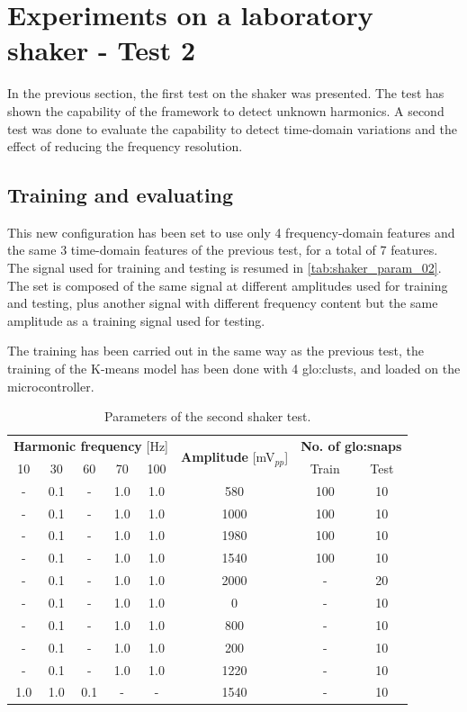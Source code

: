 \section{Experiments on a laboratory shaker - Test 2}
\label{sec:shaker_test02}
In the previous section, the first test on the shaker was presented. The test has shown the capability of the framework to detect unknown harmonics. A second test was done to evaluate the capability to detect time-domain variations and the effect of reducing the frequency resolution. 

\subsection{Training and evaluating}
This new configuration has been set to use only 4 frequency-domain features and the same 3 time-domain features of the previous test, for a total of 7 features. The signal used for training and testing is resumed in \autoref{tab:shaker_param_02}. The set is composed of the same signal at different amplitudes used for training and testing, plus another signal with different frequency content but the same amplitude as a training signal used for testing. 

The training has been carried out in the same way as the previous test, the training of the K-means model has been done with 4 \gls{glo:clust}s, and loaded on the microcontroller. 

\begin{table}
    \centering
    \caption{Parameters of the second shaker test.}
    \label{tab:shaker_param_02}
    \begin{tabular}{cccccccc} 
    \toprule
    \multicolumn{5}{c}{\textbf{Harmonic frequency} {[}Hz]} & \multirow{2}{*}{\textbf{Amplitude }{[}mV$_{pp}$]} & \multicolumn{2}{c}{\textbf{ No. of \gls{glo:snap}s}} \\
    10 & 30 & 60 & 70 & 100 &  & Train & Test \\ 
    \hline
    - & 0.1 & - & 1.0 & 1.0 & 580 & 100 & 10 \\
    - & 0.1 & - & 1.0 & 1.0 & 1000 & 100 & 10 \\
    - & 0.1 & - & 1.0 & 1.0 & 1980 & 100 & 10 \\
    - & 0.1 & - & 1.0 & 1.0 & 1540 & 100 & 10 \\
    - & 0.1 & - & 1.0 & 1.0 & 2000 & - & 20 \\
    - & 0.1 & - & 1.0 & 1.0 & 0 & - & 10 \\
    - & 0.1 & - & 1.0 & 1.0 & 800 & - & 10 \\
    - & 0.1 & - & 1.0 & 1.0 & 200 & - & 10 \\
    - & 0.1 & - & 1.0 & 1.0 & 1220 & - & 10 \\
    1.0 & 1.0 & 0.1 & - & - & 1540 & - & 10 \\
    \bottomrule
    \end{tabular}
    \end{table}



